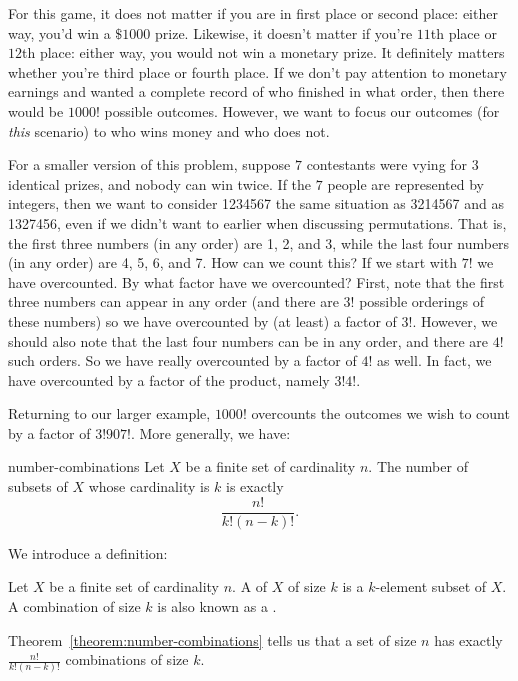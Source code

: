 \documentclass{book}
\theoremstyle{ekimcustom}
\newcommand\defn[1]{{\color{blue}{\bf #1}}}
\begin{document}
For this game, it does not matter if you are in first place or second place: either way, you'd win a $\$1000$ prize. Likewise, it doesn't matter if you're $11$th place or $12$th place: either way, you would not win a monetary prize. It definitely matters whether you're third place or fourth place. If we don't pay attention to monetary earnings and wanted a complete record of who finished in what order, then there would be $1000!$ possible outcomes. However, we want to focus our outcomes (for \emph{this} scenario) to who wins money and who does not.

For a smaller version of this problem, suppose $7$ contestants were vying for $3$ identical prizes, and nobody can win twice. If the $7$ people are represented by integers, then we want to consider 1234567 the same situation as 3214567 and as 1327456, even if we didn't want to earlier when discussing permutations. That is, the first three numbers (in any order) are 1, 2, and 3, while the last four numbers (in any order) are 4, 5, 6, and 7. How can we count this? If we start with $7!$ we have overcounted. By what factor have we overcounted? First, note that the first three numbers can appear in any order (and there are $3!$ possible orderings of these numbers) so we have overcounted by (at least) a factor of $3!$. However, we should also note that the last four numbers can be in any order, and there are $4!$ such orders. So we have really overcounted by a factor of $4!$ as well. In fact, we have overcounted by a factor of the product, namely $3!4!$.

Returning to our larger example, $1000!$ overcounts the outcomes we wish to count by a factor of $3!907!$. More generally, we have:
\begin{btheorem}{}{number-combinations}
Let $X$ be a finite set of cardinality $n$. The number of subsets of $X$ whose cardinality is $k$ is exactly \[\frac{n!}{k!(n-k)!}.\]
\end{btheorem}
We introduce a definition:
\begin{bdefinition}{}{}
Let $X$ be a finite set of cardinality $n$. A \defn{combination} of $X$ of size $k$ is a $k$-element subset of $X$. A combination of size $k$ is also known as a \defn{$k$-combination}.
\end{bdefinition}
Theorem~\ref{theorem:number-combinations} tells us that a set of size $n$ has exactly $\frac{n!}{k!(n-k)!}$ combinations of size $k$.
\end{document}
